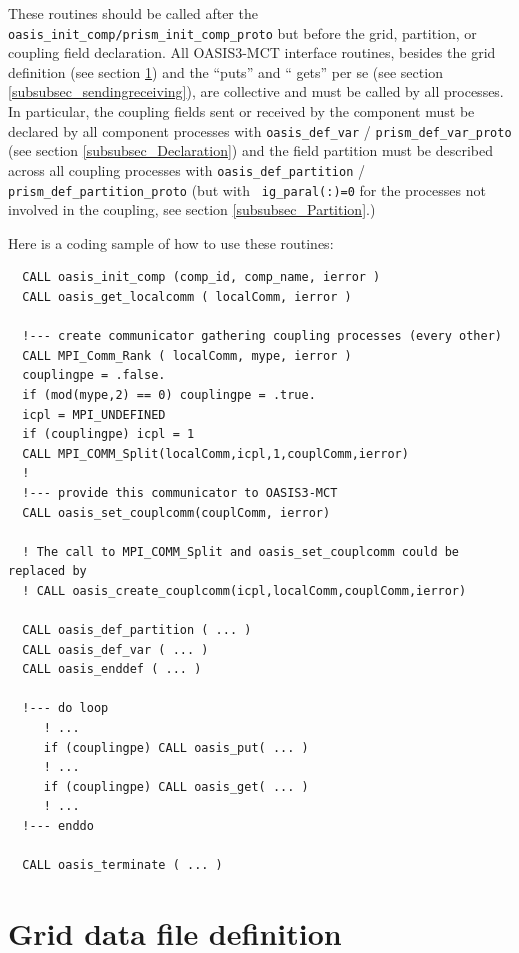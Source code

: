 These routines should be called after the {\tt oasis\_init\_comp/prism\_init\_comp\_proto}
but before the grid, partition, or coupling field declaration.
All OASIS3-MCT interface routines, besides the grid definition (see
section \ref{subsubsec_griddef}) and the ``puts'' and `` gets'' per se
(see section \ref{subsubsec_sendingreceiving}), are collective and
must be called by all processes.
In particular, the
coupling fields sent or received by the component must be declared by
all component processes
with {\tt oasis\_def\_var} / {\tt prism\_def\_var\_proto} (see section \ref{subsubsec_Declaration})
and the field partition must be described across all coupling
processes with {\tt oasis\_def\_partition} / {\tt prism\_def\_partition\_proto} (but with {\tt
  ig\_paral(:)=0} for the processes not involved in the coupling, see
section \ref{subsubsec_Partition}.) 

Here is a coding sample of how to use these routines:
 
\begin{verbatim}
  CALL oasis_init_comp (comp_id, comp_name, ierror )
  CALL oasis_get_localcomm ( localComm, ierror )

  !--- create communicator gathering coupling processes (every other)
  CALL MPI_Comm_Rank ( localComm, mype, ierror )
  couplingpe = .false.
  if (mod(mype,2) == 0) couplingpe = .true. 
  icpl = MPI_UNDEFINED
  if (couplingpe) icpl = 1
  CALL MPI_COMM_Split(localComm,icpl,1,couplComm,ierror)
  !
  !--- provide this communicator to OASIS3-MCT
  CALL oasis_set_couplcomm(couplComm, ierror)
  
  ! The call to MPI_COMM_Split and oasis_set_couplcomm could be replaced by 
  ! CALL oasis_create_couplcomm(icpl,localComm,couplComm,ierror)

  CALL oasis_def_partition ( ... )
  CALL oasis_def_var ( ... )
  CALL oasis_enddef ( ... )

  !--- do loop
     ! ...
     if (couplingpe) CALL oasis_put( ... )
     ! ...
     if (couplingpe) CALL oasis_get( ... )
     ! ...
  !--- enddo

  CALL oasis_terminate ( ... )
\end{verbatim}

\section{Grid data file definition}
\label{subsubsec_griddef}

